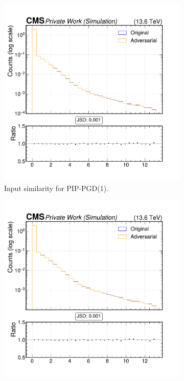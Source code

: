\begin{figure}[h]
  \centering
  \begin{subfigure}[t]{0.32\textwidth}
    \includegraphics[width=\linewidth]{media/output/features/compare/combined_it_1/cmp_vtx_arr_sv_mass.pdf}
    \caption*{Input similarity for PIP-PGD(1).}
  \end{subfigure}\hfill
  \begin{subfigure}[t]{0.32\textwidth}
    \includegraphics[width=\linewidth]{media/output/features/compare/combined_it_2/cmp_vtx_arr_sv_mass.pdf}

\end{subfigure}
\end{figure}
